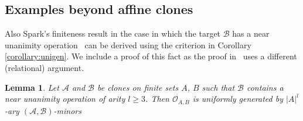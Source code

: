 \documentclass[11pt]{amsart}
\theoremstyle{plain}
\newtheorem{lemma}[thm]{Lemma}
\theoremstyle{definition}
\newcommand{\clone}[1]{\mathcal{#1}}
\newcommand{\clonoid}[1]{\mathcal{#1}}
\newcommand{\clodO}{\clonoid{O}}
\newcommand{\cloA}{\clone{A}}
\newcommand{\cloB}{\clone{B}}
\begin{document}
\subsection{Examples beyond affine clones}
Also Spark's finiteness result in the case in which the target $\cloB$ has a near unanimity operation~\cite{sparks-clonoids} can be derived using the criterion in Corollary \ref{corollary:unigen}. We include a proof of this fact as the proof in~\cite{sparks-clonoids} uses a different (relational) argument.

\begin{lemma}
Let $\cloA$ and $\cloB$ be clones on finite sets $A$, $B$ such that $\cloB$ contains a near unanimity operation of arity $l\geq 3$. Then $\clodO_{A,B}$ is uniformly generated by $|A|^l$-ary $(\cloA,\cloB)$-minors
\end{lemma}
\end{document}
